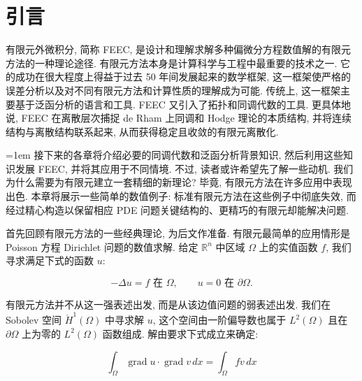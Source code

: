 \clearpage\setcounter{section}{0}
\section{{引言}}\label{chap:introduction}

{有限元外微积分, 简称 FEEC, 是设计和理解求解多种偏微分方程数值解的有限元方法的一种理论途径. 有限元方法本身是计算科学与工程中最重要的技术之一. 它的成功在很大程度上得益于过去 50 年间发展起来的数学框架, 这一框架使严格的误差分析以及对不同有限元方法和计算性质的理解成为可能. 传统上, 这一框架主要基于泛函分析的语言和工具. FEEC 又引入了拓扑和同调代数的工具. 更具体地说, FEEC 在离散层次捕捉 de Rham 上同调和 Hodge 理论的本质结构, 并将连续结构与离散结构联系起来, 从而获得稳定且收敛的有限元离散化.}

{\emergencystretch=1em
{接下来的各章将介绍必要的同调代数和泛函分析背景知识, 然后利用这些知识发展 FEEC, 并将其应用于不同情境. 不过, 读者或许希望先了解一些动机. 我们为什么需要为有限元建立一套精细的新理论? 毕竟, 有限元方法在许多应用中表现出色. 本章将展示一些简单的数值例子: 标准有限元方法在这些例子中彻底失效, 而经过精心构造以保留相应 PDE 问题关键结构的、更精巧的有限元却能解决问题.}
\par}

{首先回顾有限元方法的一些经典理论, 为后文作准备. 有限元最简单的应用情形是 Poisson 方程 Dirichlet 问题的数值求解. 给定 $\mathbb R^n$ 中区域 $\Omega$ 上的实值函数 $f$, 我们寻求满足下式的函数 $u$:}

\[
-\Delta u=f\text{{ 在 }}\Omega,\qquad u=0\text{{ 在 }}\partial\Omega.
\]

{有限元方法并不从这一强表述出发, 而是从该边值问题的弱表述出发. 我们在 Sobolev 空间 $\mathring H^1(\Omega)$ 中寻求解 $u$, 这个空间由一阶偏导数也属于 $L^2(\Omega)$ 且在 $\partial\Omega$ 上为零的 $L^2(\Omega)$ 函数组成. 解由要求下式成立来确定:}

\begin{equation}\label{eq:poisson-weak-form}
\int_\Omega\operatorname{grad}u\cdot\operatorname{grad}v\,dx=\int_\Omega fv\,dx
\end{equation}

